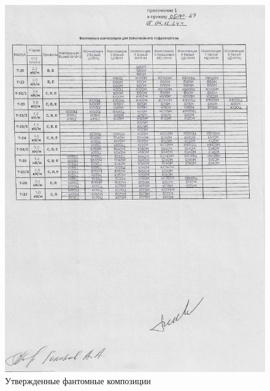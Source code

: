 \begin{figure}
\begin{center}
 \includegraphics[height=0.8\textheight, keepaspectratio]{Pics/VII 3.jpg}
\end{center}
 \caption{Утвержденные фантомные композиции}
 \label{pic:VII 3}
\end{figure}

